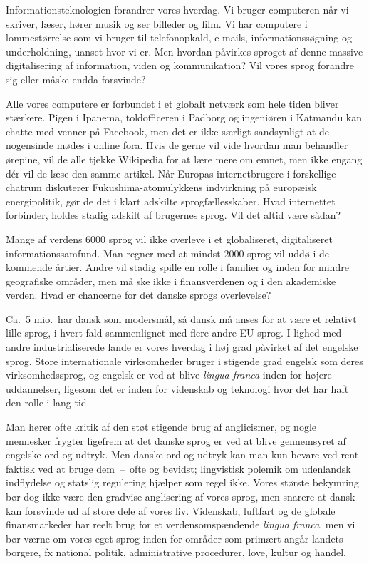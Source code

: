 \begin{multicols}{2}
 
Informationsteknologien forandrer vores hverdag. Vi bruger computeren
n\aa r vi skriver, l\ae ser, h\o rer musik og ser billeder og film. Vi har
computere i lommest\o rrelse som vi bruger til telefonopkald, e-mails,
informationss\o gning og underholdning, uanset hvor vi er. Men hvordan
p\aa virkes sproget af denne massive digitalisering af information, viden
og kommunikation? Vil vores sprog forandre sig eller m\aa ske endda
forsvinde?

Alle vores computere er forbundet i et globalt netv\ae rk som hele
tiden bliver st\ae rkere. Pigen i Ipanema, told\-officeren i Padborg og
ingeni\o ren i Katmandu kan chatte med venner \mbox{p\aa} Facebook,
men det er ikke s\ae rligt sandsynligt at de nogensinde m\o des i
online fora. Hvis de gerne vil vide hvordan man behandler \o repine,
vil de alle tjekke Wikipedia for at l\ae re mere om emnet, men ikke
engang d\'{e}r vil de l\ae se den samme artikel. N\aa r Europas
internetbrugere i forskellige chatrum diskuterer
Fukushima-atomulykkens indvirkning \mbox{p\aa} europ\ae isk
energipolitik, g\o r de det i klart adskilte sprogf\ae llesskaber.
Hvad internettet forbinder, holdes stadig adskilt af brugernes sprog.
Vil det altid v\ae re s\aa dan?

Mange af verdens 6000 sprog vil ikke overleve i et globaliseret,
digitaliseret informationssamfund. Man regner med at mindst 2000 sprog
vil \mbox{udd\o} i de kommende \aa rtier. Andre vil stadig spille en
rolle i familier og inden for mindre geografiske omr\aa der, men m\aa
ske ikke i finansverdenen og i den akademiske verden. Hvad er
chancerne for det danske sprogs overlevelse?

Ca.\ 5 mio.\ har dansk som modersm\aa l, \mbox{s\aa} dansk \mbox{m\aa}
anses for at v\ae re et relativt lille sprog, i hvert fald
sammenlignet med flere andre EU-sprog. I lighed med andre
industrialiserede lande er vores hverdag i h\o j grad p\aa virket af
det engelske sprog. Store internationale virksomheder bruger i
stigende grad engelsk som deres virksomhedssprog, og engelsk er ved at
blive {\it lingua franca} inden for h\o jere uddannelser, ligesom det
er inden for videnskab og teknologi hvor det har haft den rolle i lang
tid.

Man h\o rer ofte kritik af den st\o t stigende brug af anglicismer, og
nogle mennesker frygter ligefrem at det danske sprog er ved at blive
gennemsyret af engelske ord og udtryk. Men danske ord og udtryk kan
man kun bevare ved rent faktisk ved at bruge dem~--~ofte og bevidst;
lingvistisk polemik om udenlandsk indflydelse og statslig regulering
hj\ae lper som regel ikke. Vores st\o rste bekymring b\o r dog ikke
v\ae re den gradvise anglisering af vores sprog, men snarere at dansk
kan forsvinde ud af store dele af vores liv. Videnskab, luftfart og de
globale finansmarkeder har reelt brug for et verdensomsp\ae ndende
{\it lingua franca}, men vi b\o r v\ae rne om vores eget sprog inden
for omr\aa der som prim\ae rt ang\aa r landets borgere, fx national
politik, administrative procedurer, love, kultur og handel.


\end{multicols}

